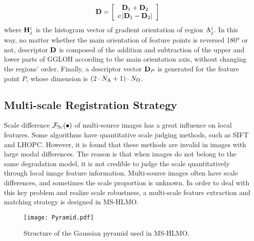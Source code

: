 \begin{equation} \label{eqdes}
{\bf{D}} = \left[ {\begin{array}{*{20}{c}}
{{{\bf{D}}_1} + {{\bf{D}}_2}}\\
{c\left| {{{\bf{D}}_1} - {{\bf{D}}_2}} \right|}
\end{array}} \right]
\end{equation}
where ${\bf{H}}_j^i$ is the histogram vector of gradient orientation of region ${\rm{A}}_j^i$. In this way, no matter whether the main orientation of feature points is reversed 180° or not, descriptor ${\bf{D}}$ is composed of the addition and subtraction of the upper and lower parts of GGLOH according to the main orientation axis, without changing the regions' order. Finally, a descriptor vector ${\bf{D}}_P$ is generated for the feature point $P$, whose dimension is $(2 \cdot {N_{\rm{A}}}+1) \cdot {N_{\rm{O}}}$.



\subsection{Multi-scale Registration Strategy}
\label{ssec:subhead}
Scale difference ${{\cal F}_{{\rm{Sc}}}}( \bullet )$ of multi-source images has a great influence on local features. Some algorithms have quantitative scale judging methods, such as SIFT \cite{lowe2004distinctive} and LHOPC. However, it is found that these methods are invalid in images with large modal differences. The reason is that when images do not belong to the same degradation model, it is not credible to judge the scale quantitatively through local image feature information. Multi-source images often have scale differences, and sometimes the scale proportion is unknown. In order to deal with this key problem and realize scale robustness, a multi-scale feature extraction and matching strategy is designed in MS-HLMO.

\begin{figure}[h!]
 \begin{center}
  \texttt{[image: Pyramid.pdf]}
  \caption{Structure of the Gaussian pyramid used in MS-HLMO.}
  \label{fig:pyramid}
 \end{center}
\end{figure}

